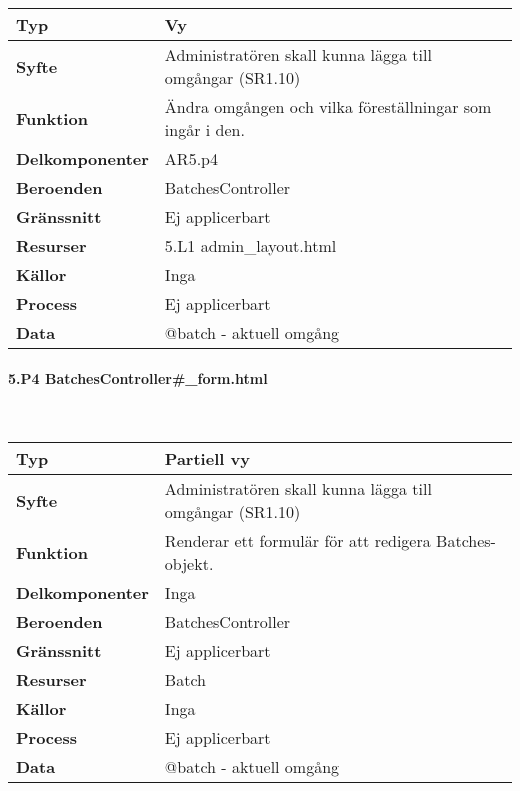 \documentclass[a4paper, twoside, 11pt, titlepage]{article}
\begin{document}
			\begin {table} [ht] \begin{tabular} {  p{3.5cm} p{11.6cm} }
				\hline
				{\sffamily\textbf{Typ}} & {Vy} \\
				\hline
				{\sffamily\textbf{Syfte}} & {Administratören skall kunna lägga till omgångar (SR1.10)} \\
				\hline
				{\sffamily\textbf{Funktion}} & {Ändra omgången och vilka föreställningar som ingår i den.} \\
				\hline
				{\sffamily\textbf{Delkomponenter}} & {AR5.p4} \\
				\hline
				{\sffamily\textbf{Beroenden}} & {BatchesController} \\
				\hline
				{\sffamily\textbf{Gränssnitt}} & {Ej applicerbart} \\
				\hline
				{\sffamily\textbf{Resurser}} & {5.L1 admin\_layout.html} \\
				\hline
				{\sffamily\textbf{Källor}} & {Inga} \\
				\hline
				{\sffamily\textbf{Process}} & {Ej applicerbart} \\
				\hline
				{\sffamily\textbf{Data}} & {@batch - aktuell omgång} \\
				\hline
			\end{tabular} \end{table} \FloatBarrier


			\clearpage %
			\paragraph{5.P4 BatchesController\#\_form.html}\

			\begin {table} [ht] \begin{tabular} {  p{3.5cm} p{11.6cm} }
				\hline
				{\sffamily\textbf{Typ}} & {Partiell vy} \\
				\hline
				{\sffamily\textbf{Syfte}} & {Administratören skall kunna lägga till omgångar (SR1.10)} \\
				\hline
				{\sffamily\textbf{Funktion}} & {Renderar ett formulär för att redigera Batches-objekt.} \\
				\hline
				{\sffamily\textbf{Delkomponenter}} & {Inga} \\
				\hline
				{\sffamily\textbf{Beroenden}} & {BatchesController} \\
				\hline
				{\sffamily\textbf{Gränssnitt}} & {Ej applicerbart} \\
				\hline
				{\sffamily\textbf{Resurser}} & {Batch} \\
				\hline
				{\sffamily\textbf{Källor}} & {Inga} \\
				\hline
				{\sffamily\textbf{Process}} & {Ej applicerbart} \\
				\hline
				{\sffamily\textbf{Data}} & {@batch - aktuell omgång} \\
				\hline
			\end{tabular} \end{table} \FloatBarrier
\end{document}
